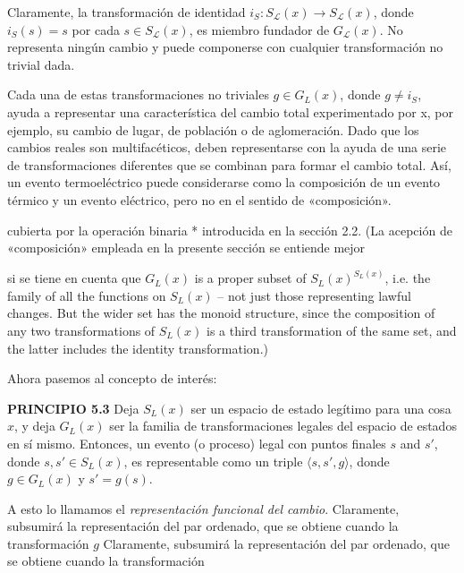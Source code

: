 \begin{justifying}
    Claramente, la transformación de identidad $i_{S}: S_{\mathcal{L}}(x)\rightarrow S_{\mathcal{L}}(x)$, donde $i_{S}(s)=s$ por cada $s\in S_{\mathcal{L}}(x)$, es miembro fundador de $G_{\mathcal{L}}(x)$. No representa ningún cambio y puede componerse con cualquier transformación no trivial dada.

Cada una de estas transformaciones no triviales $g \in G_L(x)$, donde $g \neq i_S$, ayuda a representar una característica del cambio total experimentado por x, por ejemplo, su cambio de lugar, de población o de aglomeración. Dado que los cambios reales son multifacéticos, deben representarse con la ayuda de una serie de transformaciones diferentes que se combinan para formar el cambio total. Así, un evento termoeléctrico puede considerarse como la composición de un evento térmico y un evento eléctrico, pero no en el sentido de «composición».


    cubierta por la operación binaria * introducida en la sección 2.2. (La acepción
    de «composición» empleada en la presente sección se entiende mejor

    si se tiene en cuenta que $G_L(x)$ is a proper subset of $S_L(x)^{S_L(x)}$, i.e. the family of all the functions on $S_L(x)$ -- not just those representing lawful changes. But the wider set has the monoid structure, since the composition of any two transformations of $S_L(x)$ is a third transformation of the same set, and the latter includes the identity transformation.)
    
        Ahora pasemos al concepto de interés:
    
    \textbf{PRINCIPIO 5.3} Deja $S_L(x)$ ser un espacio de estado legítimo para una cosa $x$, y deja $G_L(x)$ ser la familia de transformaciones legales del espacio de estados    en sí mismo. Entonces, un evento (o proceso) legal con puntos finales $s$ and $s'$, donde $s, s' \in S_L(x)$, es representable como un triple $\langle s, s', g   \rangle$, donde $g \in G_L(x)$ y $s' = g(s)$.

    A esto lo llamamos el \emph{representación funcional del cambio}. Claramente, subsumirá la representación del par ordenado, que se obtiene cuando la transformación $g$ Claramente, subsumirá la representación del par ordenado, que se obtiene cuando la transformación


\end{justifying}
